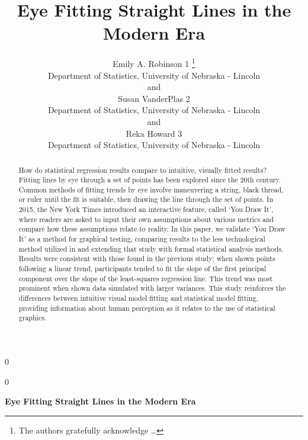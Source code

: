 \documentclass[12pt]{article}
\newcommand{\blind}{0}
\begin{document}
\def\spacingset#1{\renewcommand{\baselinestretch}%
{#1}\small\normalsize} \spacingset{1}



\blind
{
  \title{\bf Eye Fitting Straight Lines in the Modern Era}

  \author{
        Emily A. Robinson 1 \thanks{The authors gratefully acknowledge
\ldots{}} \\
    Department of Statistics, University of Nebraska - Lincoln\\
     and \\     Susan VanderPlas 2 \\
    Department of Statistics, University of Nebraska - Lincoln\\
     and \\     Reka Howard 3 \\
    Department of Statistics, University of Nebraska - Lincoln\\
      }
  \maketitle
} \fi

\blind
{
  \bigskip
  \bigskip
  \bigskip
  \begin{center}
    {\LARGE\bf Eye Fitting Straight Lines in the Modern Era}
  \end{center}
  \medskip
} \fi

\bigskip
\begin{abstract}
How do statistical regression results compare to intuitive, visually
fitted results? Fitting lines by eye through a set of points has been
explored since the 20th century. Common methods of fitting trends by eye
involve maneuvering a string, black thread, or ruler until the fit is
suitable, then drawing the line through the set of points. In 2015, the
New York Times introduced an interactive feature, called `You Draw It',
where readers are asked to input their own assumptions about various
metrics and compare how these assumptions relate to reality. In this
paper, we validate `You Draw It' as a method for graphical testing,
comparing results to the less technological method utilized in
\citet{mosteller1981eye} and extending that study with formal
statistical analysis methods. Results were consistent with those found
in the previous study; when shown points following a linear trend,
participants tended to fit the slope of the first principal component
over the slope of the least-squares regression line. This trend was most
prominent when shown data simulated with larger variances. This study
reinforces the differences between intuitive visual model fitting and
statistical model fitting, providing information about human perception
as it relates to the use of statistical graphics.
\end{abstract}
\end{document}
